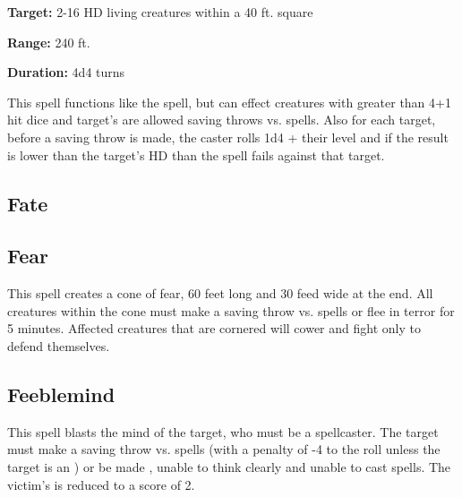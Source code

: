 \begin{multicols*}{2}
{\textbf{Target:} 2-16 HD living creatures within a 40 ft. square

\textbf{Range:} 240 ft.

\textbf{Duration:} 4d4 turns}

This spell functions like the  spell, but can effect creatures with greater than 4+1 hit dice and target's are allowed saving throws vs. spells. Also for each target, before a saving throw is made, the caster rolls 1d4 + their level and if the result is lower than the target's HD than the spell fails against that target.

\subsection{Fate}\label{spell:Fate}


\subsection{Fear}\label{spell:Fear}

This spell creates a cone of fear, 60 feet long and 30 feed wide at the end. All creatures within the cone must make a saving throw vs. spells or flee in terror for 5 minutes. Affected creatures that are cornered will cower and fight only to defend themselves.

\subsection{Feeblemind}\label{spell:Feeblemind}

This spell blasts the mind of the target, who must be a spellcaster. The target must make a saving throw vs. spells (with a penalty of -4 to the roll unless the target is an ) or be made , unable to think clearly and unable to cast spells. The victim’s  is reduced to a score of 2.


\end{multicols*}
